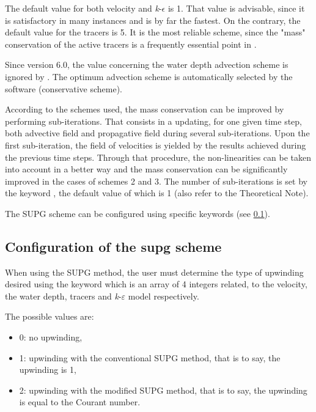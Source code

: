 The default value for both velocity and \textit{k}-$\epsilon$ is 1. That value
is advisable, since it is satisfactory in many instances and is by far the
fastest. On the contrary, the default value for the tracers is 5. It is the
most reliable scheme, since the "mass" conservation of the active tracers is a
frequently essential point in .

Since version 6.0, the value concerning the water depth advection scheme is
ignored by . The optimum advection scheme is automatically selected
by the software (conservative scheme).

According to the schemes used, the mass conservation can be improved by
performing sub-iterations. That consists in a updating, for one given time
step, both advective field and propagative field during several sub-iterations.
Upon the first sub-iteration, the field of velocities is yielded by the results
achieved during the previous time steps. Through that procedure, the
non-linearities can be taken into account in a better way and the mass
conservation can be significantly improved in the cases of schemes 2 and 3. The
number of sub-iterations is set by the keyword , the default value of which is 1 (also refer to the
Theoretical Note).

The SUPG scheme can be configured using specific keywords (see \ref{sec:supg}).

\subsection{Configuration of the supg scheme}
\label{sec:supg}
When using the SUPG method, the user must determine the type of upwinding
desired using the keyword  which is an array of
4 integers related, to the velocity, the water depth, tracers and
\textit{k}-$\varepsilon $ model respectively.

The possible values are:

\begin{itemize}
\item 0: no upwinding,

\item 1: upwinding with the conventional SUPG method, that is to say, the
upwinding is 1,

\item 2: upwinding with the modified SUPG method, that is to say, the
upwinding is equal to the Courant number.
\end{itemize}

